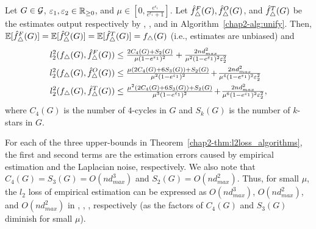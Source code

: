 \begin{theorem}\label{chap2-thm:l2loss_algorithms}
  Let $G \in \mathcal{G}$, $\varepsilon_1, \varepsilon_2 \in \mathbb{R}_{\ge0}$, and
  $\mu \in [0,\frac{e^{\epsilon_1}}{e^{\epsilon_1} + 1}]$.
  Let $\hat{f}_\triangle^F(G), \hat{f}_\triangle^O(G)$,
  and $\hat{f}_\triangle^T(G)$ be
  the
  estimates output
  respectively by \AlgOne{}, \AlgTwo{}, and \AlgThree{} in Algorithm~\ref{chap2-alg:unify}.
  Then, $\operatorname{\mathbb{E}}[\hat{f}_\triangle^F(G)] = \operatorname{\mathbb{E}}[\hat{f}_\triangle^O(G)] = \operatorname{\mathbb{E}}[\hat{f}_\triangle^T(G)] = f_\triangle(G)$ (i.e., estimates are unbiased) and
   \begin{align*}
      l_2^2(f_\triangle(G), \hat{f}_\triangle^F(G)) &\leq \textstyle{\frac{2C_4(G)+S_2(G)}{\mu(1-e^{\varepsilon_1})^2} + \frac{2nd_{max}^2}{\mu^2(1-e^{\varepsilon_1})^2\varepsilon_2^2}} \\
      l_2^2(f_\triangle(G), \hat{f}_\triangle^O(G)) &\leq \textstyle{\frac{\mu(2 C_4(G) + 6S_3(G)) + S_2(G)}{\mu^2(1-e^{\varepsilon_1})^2} \hspace{-0.5mm}+\hspace{-0.5mm} \frac{2nd_{max}^2}{\mu^4(1-e^{\varepsilon_1})^2\varepsilon_2^2}}\\
      l_2^2(f_\triangle(G), \hat{f}_\triangle^T(G)) &\leq \textstyle{\frac{\mu^2(2 C_4(G) + 6S_3(G)) + S_2(G)}{\mu^3(1-e^{\varepsilon_1})^2} \hspace{-0.5mm}+\hspace{-0.5mm} \frac{2nd_{max}^2}{\mu^6(1-e^{\varepsilon_1})^2\varepsilon_2^2},}
   \end{align*}
   where $C_4(G)$ is the number of $4$-cycles in $G$
   and $S_k(G)$ is the number of $k$-stars in $G$. %
\end{theorem}
For each of the three upper-bounds in Theorem~\ref{chap2-thm:l2loss_algorithms}, the first and second terms are the estimation errors caused by empirical estimation and the Laplacian noise, respectively.
We also note that
$C_4(G) = S_3(G) = O(n d_{max}^3)$
and $S_2(G) = O(n d_{max}^2)$.
Thus, for small
$\mu$,
the $l_2$ loss of empirical estimation can be expressed as $O(n d_{max}^3)$, $O(n d_{max}^2)$, and $O(n d_{max}^2)$ in \AlgOne{}, \AlgTwo{}, \AlgThree{}, respectively
(as the factors of $C_4(G)$ and $S_3(G)$
diminish for small $\mu$).

